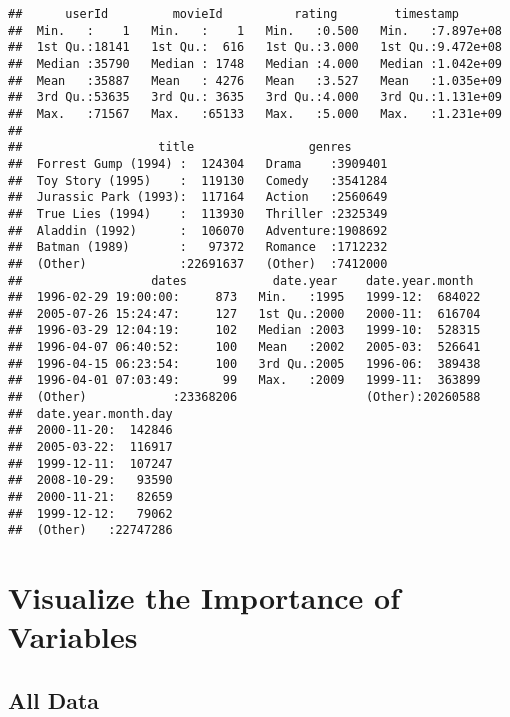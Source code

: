 \documentclass[]{article}
\begin{document}
\begin{verbatim}
##      userId         movieId          rating        timestamp        
##  Min.   :    1   Min.   :    1   Min.   :0.500   Min.   :7.897e+08  
##  1st Qu.:18141   1st Qu.:  616   1st Qu.:3.000   1st Qu.:9.472e+08  
##  Median :35790   Median : 1748   Median :4.000   Median :1.042e+09  
##  Mean   :35887   Mean   : 4276   Mean   :3.527   Mean   :1.035e+09  
##  3rd Qu.:53635   3rd Qu.: 3635   3rd Qu.:4.000   3rd Qu.:1.131e+09  
##  Max.   :71567   Max.   :65133   Max.   :5.000   Max.   :1.231e+09  
##                                                                     
##                   title                genres       
##  Forrest Gump (1994) :  124304   Drama    :3909401  
##  Toy Story (1995)    :  119130   Comedy   :3541284  
##  Jurassic Park (1993):  117164   Action   :2560649  
##  True Lies (1994)    :  113930   Thriller :2325349  
##  Aladdin (1992)      :  106070   Adventure:1908692  
##  Batman (1989)       :   97372   Romance  :1712232  
##  (Other)             :22691637   (Other)  :7412000  
##                  dates            date.year    date.year.month   
##  1996-02-29 19:00:00:     873   Min.   :1995   1999-12:  684022  
##  2005-07-26 15:24:47:     127   1st Qu.:2000   2000-11:  616704  
##  1996-03-29 12:04:19:     102   Median :2003   1999-10:  528315  
##  1996-04-07 06:40:52:     100   Mean   :2002   2005-03:  526641  
##  1996-04-15 06:23:54:     100   3rd Qu.:2005   1996-06:  389438  
##  1996-04-01 07:03:49:      99   Max.   :2009   1999-11:  363899  
##  (Other)            :23368206                  (Other):20260588  
##  date.year.month.day  
##  2000-11-20:  142846  
##  2005-03-22:  116917  
##  1999-12-11:  107247  
##  2008-10-29:   93590  
##  2000-11-21:   82659  
##  1999-12-12:   79062  
##  (Other)   :22747286
\end{verbatim}

\pagebreak   
\normalsize

\hypertarget{visualize-the-importance-of-variables}{%
\section{Visualize the Importance of
Variables}\label{visualize-the-importance-of-variables}}

\hypertarget{all-data}{%
\subsection{All Data}\label{all-data}}
\end{document}
